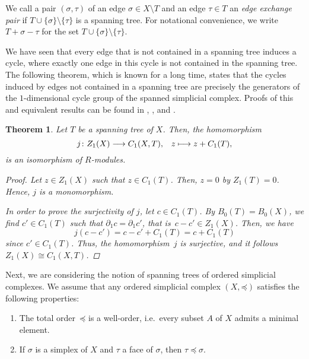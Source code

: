 \documentclass[oneside]{amsart}
\newtheorem{theorem}{Theorem}
\theoremstyle{definition}
\begin{document}
We call a pair $(\sigma, \tau)$ of an edge $\sigma \in X \setminus T$ and an edge $\tau \in T$ an \emph{edge exchange pair} if $T \cup \{ \sigma \} \setminus \{ \tau \}$ is a spanning tree.
For notational convenience, we write $T + \sigma - \tau$ for the set $T \cup \{ \sigma \} \setminus \{ \tau \}$.

We have seen that every edge that is not contained in a spanning tree induces a cycle, where exactly one edge in this cycle is not contained in the spanning tree.
The following theorem, which is known for a long time, states that the cycles induced by edges not contained in a spanning tree are precisely the generators of the $1$-dimensional cycle group of the spanned simplicial complex.
Proofs of this and equivalent results can be found in \cite[Theorem~1.9.4]{Diestel2017}, \cite[Theorem~2.33]{Kozlov2020}, and \cite[Theorem~3, p.\ 140]{Spanier1982}.

\begin{theorem}%
    \label{theorem:SpanningTreeMain}
    Let $T$ be a spanning tree of $X$.
    Then, the homomorphism
    \[ j\colon Z_1(X) \longrightarrow C_1(X, T) \text, \quad z \longmapsto z + C_1(T) \text, \]
    is an isomorphism of $R$-modules.

    \begin{proof}
        Let $z \in Z_1(X)$ such that $z \in C_1(T)$.
        Then, $z = 0$ by $Z_1(T) = 0$.
        Hence, $j$ is a monomorphism.
    
        In order to prove the surjectivity of $j$, let $c \in C_1(T)$.
        By $B_0(T) = B_0(X)$, we find $c' \in C_1(T)$ such that $\partial_1 c = \partial_1 c'$, that is~$c - c' \in Z_1(X)$.
        Then, we have
        \[ j(c - c') = c - c' + C_1(T) = c + C_1(T) \]
        since $c' \in C_1(T)$.
        Thus, the homomorphism~$j$ is surjective, and it follows $Z_1(X) \cong C_1(X, T)$.
    \end{proof}
\end{theorem}

Next, we are considering the notion of spanning trees of ordered simplicial complexes.
We assume that any ordered simplicial complex $(X, \mathord\preceq)$ satisfies the following properties:
\begin{enumerate}[label=(\roman*)]
    \item The total order~$\mathord\preceq$ is a well-order, i.e.\ every subset $A$ of $X$ admits a minimal element.
    \item If $\sigma$ is a simplex of $X$ and $\tau$ a face of $\sigma$, then $\tau \preceq \sigma$.
\end{enumerate}
\end{document}
